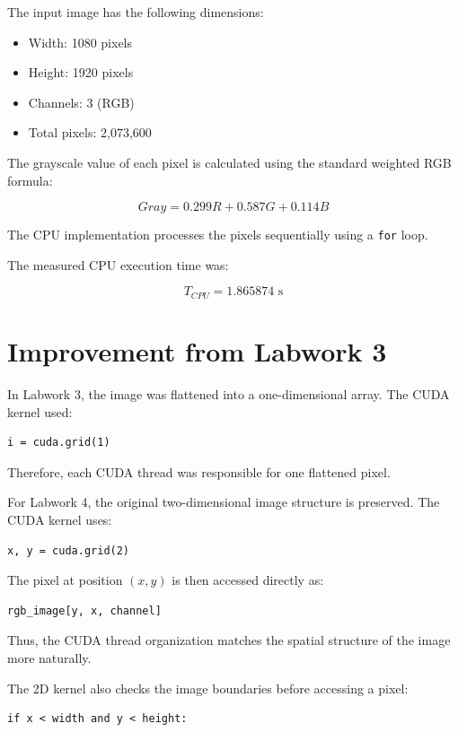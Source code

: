 \documentclass[11pt]{article}
\begin{document}
The input image has the following dimensions:

\begin{itemize}
    \item Width: 1080 pixels
    \item Height: 1920 pixels
    \item Channels: 3 (RGB)
    \item Total pixels: 2,073,600
\end{itemize}

The grayscale value of each pixel is calculated using the standard weighted
RGB formula:

\[
Gray = 0.299R + 0.587G + 0.114B
\]

The CPU implementation processes the pixels sequentially using a
\texttt{for} loop.

The measured CPU execution time was:

\[
T_{CPU} = 1.865874\text{ s}
\]

\section{Improvement from Labwork 3}

In Labwork 3, the image was flattened into a one-dimensional array.
The CUDA kernel used:

\begin{verbatim}
i = cuda.grid(1)
\end{verbatim}

Therefore, each CUDA thread was responsible for one flattened pixel.

For Labwork 4, the original two-dimensional image structure is preserved.
The CUDA kernel uses:

\begin{verbatim}
x, y = cuda.grid(2)
\end{verbatim}

The pixel at position $(x,y)$ is then accessed directly as:

\begin{verbatim}
rgb_image[y, x, channel]
\end{verbatim}

Thus, the CUDA thread organization matches the spatial structure of the
image more naturally.

The 2D kernel also checks the image boundaries before accessing a pixel:

\begin{verbatim}
if x < width and y < height:
\end{verbatim}
\end{document}
